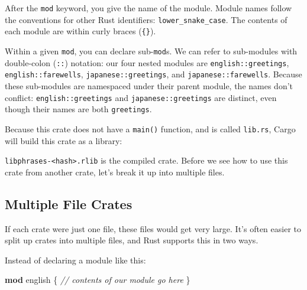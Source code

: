 \documentclass[a4paper,]{book}
\newenvironment{Shaded}{\begin{snugshade}}{\end{snugshade}}
\newcommand{\KeywordTok}[1]{\textcolor[rgb]{0.13,0.29,0.53}{\textbf{{#1}}}}
\newcommand{\CommentTok}[1]{\textcolor[rgb]{0.56,0.35,0.01}{\textit{{#1}}}}
\newcommand{\NormalTok}[1]{{#1}}
\begin{document}
After the \texttt{mod} keyword, you give the name of the module. Module
names follow the conventions for other Rust identifiers:
\texttt{lower\_snake\_case}. The contents of each module are within
curly braces (\texttt{\{\}}).

Within a given \texttt{mod}, you can declare sub-\texttt{mod}s. We can
refer to sub-modules with double-colon (\texttt{::}) notation: our four
nested modules are \texttt{english::greetings},
\texttt{english::farewells}, \texttt{japanese::greetings}, and
\texttt{japanese::farewells}. Because these sub-modules are namespaced
under their parent module, the names don't conflict:
\texttt{english::greetings} and \texttt{japanese::greetings} are
distinct, even though their names are both \texttt{greetings}.

Because this crate does not have a \texttt{main()} function, and is
called \texttt{lib.rs}, Cargo will build this crate as a library:

\begin{Shaded}
\end{Shaded}

\texttt{libphrases-\textless{}hash\textgreater{}.rlib} is the compiled
crate. Before we see how to use this crate from another crate, let's
break it up into multiple files.

\subsection{Multiple File Crates}\label{multiple-file-crates}

If each crate were just one file, these files would get very large. It's
often easier to split up crates into multiple files, and Rust supports
this in two ways.

Instead of declaring a module like this:

\begin{Shaded}
\begin{Highlighting}[]
\KeywordTok{mod} \NormalTok{english \{}
    \CommentTok{// contents of our module go here}
\NormalTok{\}}
\end{Highlighting}
\end{Shaded}
\end{document}
